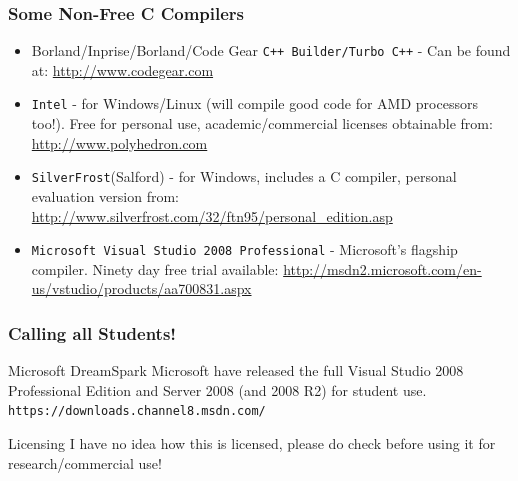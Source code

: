 \documentclass[table]{beamer}
\let\oldurl=\url
\renewcommand{\url}[1]{\textcolor{blue}{\oldurl{#1}}}
\begin{document}
\begin{frame}
\frametitle{Some Non-Free C Compilers}
\begin{itemize}
\item Borland/Inprise/Borland/Code Gear {\tt C++ Builder/Turbo C++} - Can be found at: \url{http://www.codegear.com}
\item {\tt Intel} - for Windows/Linux (will compile good code for AMD processors
too!). Free for personal use, academic/commercial licenses obtainable from:
\url{http://www.polyhedron.com}

\item {\tt SilverFrost}(Salford) - for Windows, includes a C compiler, personal evaluation version from:
\url{http://www.silverfrost.com/32/ftn95/personal_edition.asp}
\item{\tt Microsoft Visual Studio 2008 Professional} - Microsoft's flagship compiler. Ninety day free trial available:
\url{http://msdn2.microsoft.com/en-us/vstudio/products/aa700831.aspx}
\end{itemize}
\end{frame}

\begin{frame}
\frametitle{Calling all Students!}
\begin{exampleblock}{Microsoft DreamSpark}
Microsoft have released the full Visual Studio 2008 Professional Edition and Server 2008 (and 2008 R2) for student use.
{\tt https://downloads.channel8.msdn.com/}
\end{exampleblock}
\begin{alertblock}{Licensing}
I have no idea how this is licensed, please do check before using it for research/commercial use!
\end{alertblock}
\end{frame}
\end{document}
